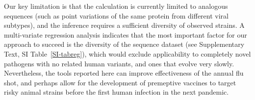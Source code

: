 \documentclass[onecolumn, compsoc,10pt]{IEEEtran}
\begin{document}
Our key limitation is that the \qdist calculation   is currently limited to analogous sequences (such as point variations of the same protein from different viral subtypes), and the \enet inference requires a  sufficient diversity of observed strains. A multi-variate regression analysis indicates  that the most important factor for our approach to succeed is  the diversity of the sequence dataset (see Supplementary Text, SI Table~\ref{SI-tabreg}), which would exclude applicability to completely novel pathogens with no related human variants, and ones that evolve very slowly. Nevertheless, the tools reported here can improve effectiveness of the annual flu shot, and perhaps allow for the development of premeptive vaccines to  target risky animal strains  before the first human infection in the next pandemic.


\end{document}
